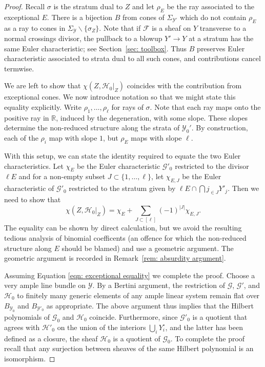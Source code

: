 \documentclass[11pt]{amsart}
\theoremstyle{definition}
\theoremstyle{definition}
\newcommand{\cY}{\mathcal{Y}}
\newcommand{\cal}{\mathcal}
\def\cY{{\cal Y}}
\begin{document}
\begin{proof}
Recall $\sigma$ is the stratum dual to $Z$ and let $\rho_E$ be the ray associated to the exceptional $E$. There is a bijection $B$ from cones of $\Sigma_{\mathcal Y'}$ which do not contain $\rho_E$ as a ray to cones in $\Sigma_{\mathcal Y}\backslash \{\sigma_Z\}$. Note that if $\mathcal F$ is a sheaf on $Y$ transverse to a normal crossings divisor, the pullback to a blowup $Y'\to Y$ at a stratum has the same Euler characteristic; see Section~\ref{sec: toolbox}. Thus $B$ preserves Euler characteristic associated to strata dual to all such cones, and contributions cancel termwise. 

We are left to show that $\chi (Z,\mathcal H_0|_Z)$ coincides with the contribution from exceptional cones. We now introduce notation so that we might state this equality explicitly. Write $\rho_1,\ldots, \rho_\ell$ for rays of $\sigma$. Note that each ray maps onto the positive ray in $\mathbb R$, induced by the degeneration, with some slope. These slopes determine the non-reduced structure along the strata of $\cY_0'$. By construction, each of the $\rho_i$ map with slope $1$, but $\rho_E$ maps with slope $\ell$. 

With this setup, we can state the identity required to equate the two Euler characteristics. Let $\chi_E$ be the Euler characteristic $\mathcal G'_0$ restricted to the divisor $\ell E$ and for a non-empty subset $J\subset \{1,\ldots,\ell\}$, let $\chi_{E,J}$ be the Euler characteristic of $\mathcal G'_0$ restricted to the stratum given by $\ell E\cap\bigcap j_{\in J} Y'_j$. Then we need to show that
\begin{equation}\label{eqn: exceptional equality}
\chi (Z,\mathcal H_0|_Z) = \chi_E +\sum_{J\subset [\ell]} (-1)^{|J|} \chi_{E,J}.
\end{equation}
The equality can be shown by direct calculation, but we avoid the resulting tedious analysis of binomial coefficents (an offence for which the non-reduced structure along $E$ should be blamed) and use a geometric argument. The geometric argument is recorded in Remark~\ref{rem: absurdity argument}.

Assuming Equation \ref{eqn: exceptional equality} we complete the proof. Choose a very ample line bundle on $\mathcal Y$. By a Bertini argument, the restriction of $\mathcal G$, $\mathcal G'$, and $\mathcal H_0$ to finitely many generic elements of any ample linear system remain flat over $B_{\mathcal{Y}_0}$ and $B_{\mathcal{Y}'_0}$ as appropriate. The above argument thus implies that the Hilbert polynomials of $\mathcal G_0$ and $\mathcal{H}_0$ coincide. Furthermore, since $\mathcal G'_0$ is a quotient that agrees with $\mathcal H'_0$ on the union of the interiors $\bigcup_i Y_i^\circ$, and the latter has been defined as a closure, the sheaf $\mathcal H_0$ is a quotient of $\mathcal G_0$. To complete the proof recall that any surjection between sheaves of the same Hilbert polynomial is an isomorphism. 
\end{proof}
\end{document}
